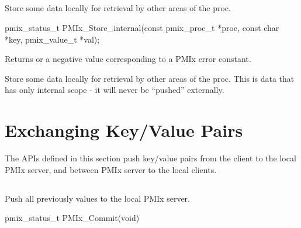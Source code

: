 \subsection{}

\summary

Store some data locally for retrieval by other areas of the proc.

\format

\cspecificstart
\begin{codepar}
pmix_status_t
PMIx_Store_internal(const pmix_proc_t *proc,
                    const char *key, pmix_value_t *val);
\end{codepar}
\cspecificend

\begin{arglist}
\end{arglist}

Returns  or a negative value corresponding to a PMIx error constant.

\descr

Store some data locally for retrieval by other areas of the proc.
This is data that has only internal scope - it will never be ``pushed'' externally.


\section{Exchanging Key/Value Pairs}
\label{chap:api_kv_mgmt:exchange}

The APIs defined in this section push key/value pairs from the client to the local \ac{PMIx} server, and between \ac{PMIx} server to the local clients.

\subsection{}

\summary

Push all previously  values to the local PMIx server.

\format

\cspecificstart
\begin{codepar}
pmix_status_t PMIx_Commit(void)
\end{codepar}
\cspecificend

